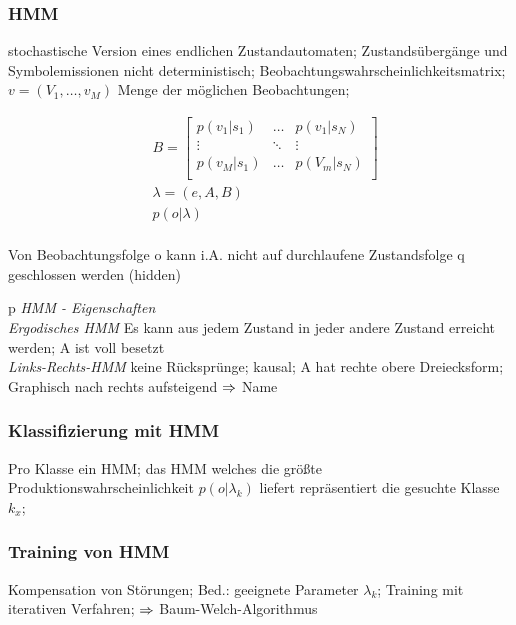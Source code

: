 \documentclass[german,color,6pt]{latex4ei/latex4ei_sheet}
\begin{document}
\begin{sectionbox}
\subsubsection{HMM}
stochastische Version eines endlichen Zustandautomaten; Zustandsübergänge und Symbolemissionen nicht deterministisch; Beobachtungswahrscheinlichkeitsmatrix; $v = (V_1, \dots, v_M)$ Menge der möglichen Beobachtungen; 

\begin{equation*}
\begin{split}
&	B = \begin{bmatrix}
	p(v_1 | s_1) & \dots & p(v_1 | s_N) \\
	\vdots & \ddots & \vdots \\
	p(v_M | s_1) & \dots & p(V_m | s_N) \\
\end{bmatrix} \\
& \lambda = (e, A, B) \\
& p(o | \lambda ) \\
\end{split}
\end{equation*}

Von Beobachtungsfolge o kann i.A. nicht auf durchlaufene Zustandsfolge q geschlossen werden (hidden)

\begin{tablebox}{p{\textwidth}}
\emph{HMM - Eigenschaften} \\ %
\cmrule
\emph{Ergodisches HMM} \quad Es kann aus jedem Zustand in jeder andere Zustand erreicht werden; A ist voll besetzt \\
\emph{Links-Rechts-HMM} \quad keine Rücksprünge; kausal; A hat rechte obere Dreiecksform; Graphisch nach rechts aufsteigend $\Rightarrow$ Name
\end{tablebox}
\end{sectionbox}

\begin{sectionbox}
\subsubsection{Klassifizierung mit HMM}
Pro Klasse ein HMM; das HMM welches die größte Produktionswahrscheinlichkeit $p(o|\lambda_k)$ liefert repräsentiert die gesuchte Klasse $k_x$; 
\end{sectionbox}

\begin{sectionbox}
\subsubsection{Training von HMM}
Kompensation von Störungen; Bed.: geeignete Parameter $\lambda_k$; Training mit iterativen Verfahren; $\Rightarrow$ Baum-Welch-Algorithmus
\end{sectionbox}
\end{document}
